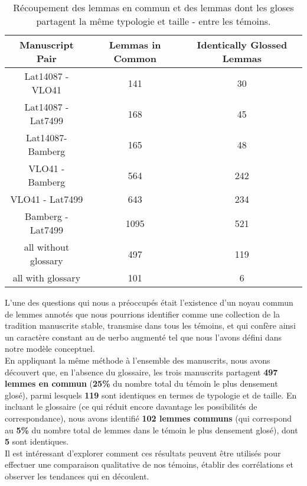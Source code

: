 \documentclass[a4paper, twoside, 12pt]{book}
\begin{document}
{\begin{table}[H]
    \centering
    \begin{tabular}{|c|c|c|}
        \hline
        \rowcolor{gray!20}
        \textbf{Manuscript Pair} & \textbf{Lemmas in Common} & \textbf{Identically Glossed Lemmas} \\\hline
        \hline
        Lat14087 - VLO41 & 141 & 30 \\ \hline
         Lat14087 - Lat7499 & 168 & 45 \\
        \hline
        Lat14087- Bamberg & 165 & 48 \\\hline
        VLO41 - Bamberg & 564 & 242 \\\hline
        VLO41 - Lat7499 & 643 & 234 \\\hline
        Bamberg - Lat7499 & 1095 & 521  \\\hline
        all without glossary & 497 & 119
        \\\hline
        all with glossary & 101 & 6   
        \\\hline
    \end{tabular}
    \caption{Récoupement des lemmas en commun et des lemmas dont les gloses partagent la même typologie et taille - entre les témoins.}
    \label{tab:lemma_comparison}
\end{table}

L'une des questions qui nous a préoccupés était l'existence d'un \og{}noyau commun\fg{} de lemmes annotés que nous pourrions identifier comme une \og{} collection \fg{} de la tradition manuscrite stable, transmise dans tous les témoins, et qui confère ainsi un caractère constant au \og{}de uerbo augmenté\fg{} tel que nous l'avons défini dans notre modèle conceptuel.\\

En appliquant la même méthode à l'ensemble des manuscrits, nous avons découvert que, en l'absence du glossaire, les trois manuscrits partagent \textbf{497 lemmes en commun} (\textbf{25\%} du nombre total du témoin le plus densement glosé), parmi lesquels \textbf{119} sont identiques en termes de typologie et de taille. En incluant le glossaire (ce qui réduit encore davantage les possibilités de correspondance), nous avons identifié \textbf{102 lemmes communs} (qui correspond au \textbf{5\%} du nombre total de lemmes dans le témoin le plus densement glosé), dont \textbf{5} sont identiques.\\

Il est intéressant d'explorer comment ces résultats peuvent être utilisés pour effectuer une comparaison qualitative de nos témoins, établir des corrélations et observer les tendances qui en découlent.\\


}
\end{document}
